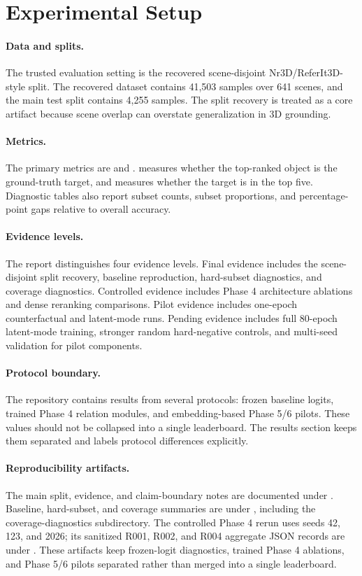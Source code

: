 \section{Experimental Setup}

\paragraph{Data and splits.}
The trusted evaluation setting is the recovered scene-disjoint Nr3D/ReferIt3D-style split. The recovered dataset contains 41,503 samples over 641 scenes, and the main test split contains 4,255 samples. The split recovery is treated as a core artifact because scene overlap can overstate generalization in 3D grounding.

\paragraph{Metrics.}
The primary metrics are \acc{} and \acctopfive{}. \acc{} measures whether the top-ranked object is the ground-truth target, and \acctopfive{} measures whether the target is in the top five. Diagnostic tables also report subset counts, subset proportions, and percentage-point gaps relative to overall accuracy.

\paragraph{Evidence levels.}
The report distinguishes four evidence levels. Final evidence includes the scene-disjoint split recovery, baseline reproduction, hard-subset diagnostics, and coverage diagnostics. Controlled evidence includes Phase 4 architecture ablations and dense reranking comparisons. Pilot evidence includes one-epoch counterfactual and latent-mode runs. Pending evidence includes full 80-epoch latent-mode training, stronger random hard-negative controls, and multi-seed validation for pilot components.

\paragraph{Protocol boundary.}
The repository contains results from several protocols: frozen baseline logits, trained Phase 4 relation modules, and embedding-based Phase 5/6 pilots. These values should not be collapsed into a single leaderboard. The results section keeps them separated and labels protocol differences explicitly.

\paragraph{Reproducibility artifacts.}
The main split, evidence, and claim-boundary notes are documented under . Baseline, hard-subset, and coverage summaries are under , including the coverage-diagnostics subdirectory. The controlled Phase 4 rerun uses seeds 42, 123, and 2026; its sanitized R001, R002, and R004 aggregate JSON records are under . These artifacts keep frozen-logit diagnostics, trained Phase 4 ablations, and Phase 5/6 pilots separated rather than merged into a single leaderboard.
